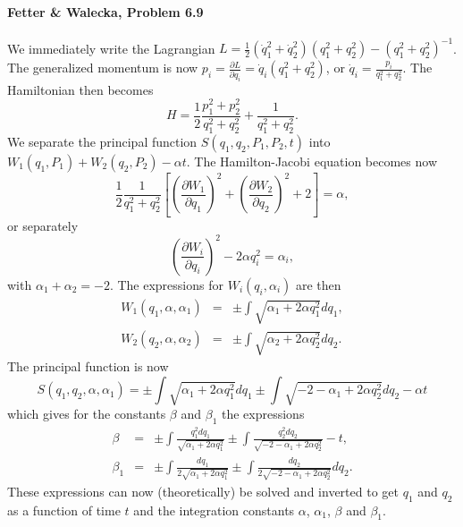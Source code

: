 \documentclass[letterpaper,11pt]{article}
\begin{document}
\paragraph{Fetter \& Walecka, Problem 6.9}
We immediately write the Lagrangian $L = \frac{1}{2} (\dot{q}_1^2 + \dot{q}_2^2) (q_1^2 + q_2^2) - (q_1^2 + q_2^2)^{-1}$.  The generalized momentum is now $p_i = \frac{\partial L}{\partial q_i} = \dot{q}_i (q_1^2 + q_2^2)$, or $\dot{q}_i = \frac{p_i}{q_1^2 + q_2^2}$.  The Hamiltonian then becomes
\begin{equation*}
 H = \frac{1}{2} \frac{p_1^2 + p_2^2}{q_1^2 + q_2^2} + \frac{1}{q_1^2 + q_2^2}.
\end{equation*}
We separate the principal function $S(q_1,q_2,P_1,P_2,t)$ into $W_1(q_1,P_1) + W_2(q_2,P_2) - \alpha t$.  The Hamilton-Jacobi equation becomes now
\begin{equation*}
 \frac{1}{2} \frac{1}{q_1^2 + q_2^2} \left[ \left(\frac{\partial W_1}{\partial q_1}\right)^2 + \left(\frac{\partial W_2}{\partial q_2}\right)^2 + 2 \right] = \alpha,
\end{equation*}
or separately
\begin{equation*}
 \left(\frac{\partial W_i}{\partial q_i}\right)^2 - 2\alpha q_i^2 = \alpha_i,
\end{equation*}
with $\alpha_1 + \alpha_2 = -2$.  The expressions for $W_i(q_i,\alpha_i)$ are then
\begin{eqnarray*}
 W_1(q_1,\alpha,\alpha_1) & = & \pm \int \sqrt{\alpha_1 + 2\alpha q_1^2} dq_1, \\
 W_2(q_2,\alpha,\alpha_2) & = & \pm \int \sqrt{\alpha_2 + 2\alpha q_2^2} dq_2.
\end{eqnarray*}
The principal function is now
\begin{equation*}
 S(q_1,q_2,\alpha,\alpha_1) = \pm \int \sqrt{\alpha_1 + 2\alpha q_1^2} dq_1 \pm \int \sqrt{-2 -\alpha_1 + 2\alpha q_2^2} dq_2 - \alpha t
\end{equation*}
which gives for the constants $\beta$ and $\beta_1$ the expressions
\begin{eqnarray*}
 \beta & = & \pm \int \frac{q_1^2 dq_1}{\sqrt{\alpha_1 + 2\alpha q_1^2}} \pm \int \frac{q_2^2 dq_2}{\sqrt{-2 -\alpha_1 + 2\alpha q_2^2}} - t, \\
 \beta_1 & = & \pm \int \frac{dq_1}{2\sqrt{\alpha_1 + 2\alpha q_1^2}} \pm \int \frac{dq_2}{2\sqrt{-2 -\alpha_1 + 2\alpha q_2^2}} dq_2.
\end{eqnarray*}
These expressions can now (theoretically) be solved and inverted to get $q_1$ and $q_2$ as a function of time $t$ and the integration constants $\alpha$, $\alpha_1$, $\beta$ and $\beta_1$.
\end{document}

